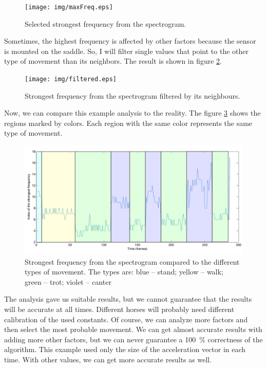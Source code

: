 \begin{figure}
    \centering
    \label{fig:spectralHighest}
    \caption{Selected strongest frequency from the spectrogram.}
    \texttt{[image: img/maxFreq.eps]}
\end{figure}

Sometimes, the highest frequency is affected by other factors because the sensor is mounted on the saddle. So, I will filter single values that point to the other type of movement than its neighbors. The result is shown in figure \ref{fig:spectralFiltered}.

\begin{figure}
    \centering
    \label{fig:spectralFiltered}
    \caption{Strongest frequency from the spectrogram filtered by its neighbours.}
    \texttt{[image: img/filtered.eps]}
\end{figure}

Now, we can compare this example analysis to the reality. The figure \ref{fig:spectralMarked} shows the regions marked by colors. Each region with the same color represents the same type of movement.

\begin{figure}
    \centering
    \label{fig:spectralMarked}
    \caption{Strongest frequency from the spectrogram compared to the different types of movement. The types are: blue -- stand; yellow -- walk; green -- trot; violet -- canter}
    \includegraphics[width=\linewidth]{img/filteredMarked.pdf}
\end{figure}

The analysis gave us suitable results, but we cannot guarantee that the results will be accurate at all times. Different horses will probably need different calibration of the used constants. Of course, we can analyze more factors and then select the most probable movement. We can get almost accurate results with adding more other factors, but we can never guarantee a \SI{100}{\%} correctness of the algorithm. This example used only the size of the acceleration vector in each time. With other values, we can get more accurate results as well.

